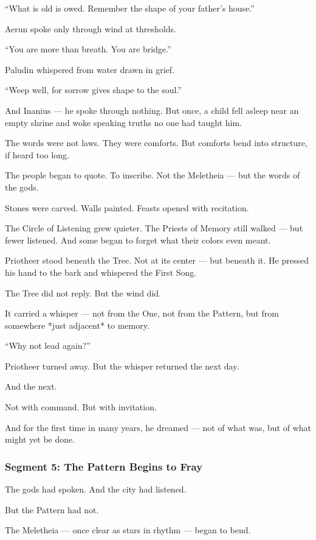 \documentclass[9pt]{article}
\begin{document}
 “What is old is owed. Remember the shape of your father’s house.”

Aerun spoke only through wind at thresholds.  

 “You are more than breath. You are bridge.”

Paludin whispered from water drawn in grief.

 “Weep well, for sorrow gives shape to the soul.”

And Inanius —  
he spoke through nothing.  
But once, a child fell asleep near an empty shrine and woke speaking truths no one had taught him.

The words were not laws.  
They were comforts.  
But comforts bend into structure, if heard too long.

The people began to quote.  
To inscribe.  
Not the Meletheia — but the words of the gods.

Stones were carved.  
Walls painted.  
Feasts opened with recitation.

The Circle of Listening grew quieter.  
The Priests of Memory still walked —  
but fewer listened.  
And some began to forget what their colors even meant.

Priotheer stood beneath the Tree.  
Not at its center — but beneath it.  
He pressed his hand to the bark and whispered the First Song.

The Tree did not reply.  
But the wind did.

It carried a whisper — not from the One,  
not from the Pattern,  
but from somewhere *just adjacent* to memory.

 “Why not lead again?”

Priotheer turned away.  
But the whisper returned the next day.

And the next.

Not with command.  
But with invitation.

And for the first time in many years,  
he dreamed —  
not of what was,  
but of what might yet be done.

\newpage

\subsubsection*{Segment 5: The Pattern Begins to Fray}

The gods had spoken.  
And the city had listened.

But the Pattern had not.

The Meletheia — once clear as stars in rhythm — began to bend. 
\end{document}
